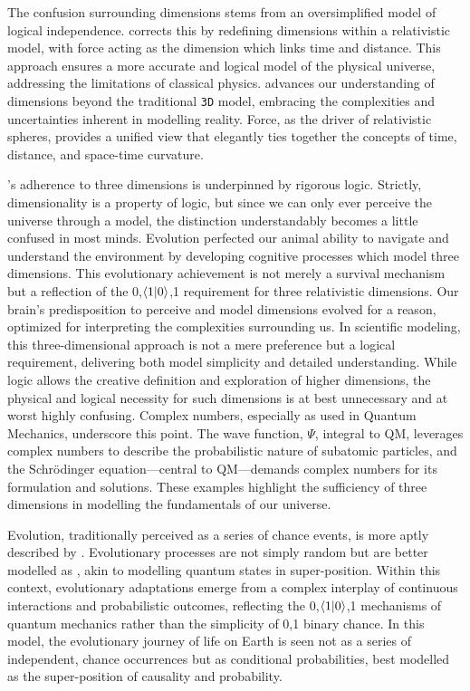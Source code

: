 \documentclass[12pt]{article}
\begin{document}
The confusion surrounding dimensions stems from an oversimplified model of logical independence. \iR{} corrects this by redefining dimensions within a relativistic model, with force acting as the dimension which links time and distance. This approach ensures a more accurate and logical model of the physical universe, addressing the limitations of classical physics. \iR{} advances our understanding of dimensions beyond the traditional \texttt{3D} model, embracing the complexities and uncertainties inherent in modelling reality. Force, as the driver of relativistic spheres, provides a unified view that elegantly ties together the concepts of time, distance, and space-time curvature.

\iR{}'s adherence to three dimensions is underpinned by rigorous logic. Strictly, dimensionality is a property of logic, but since we can only ever perceive the universe through a model, the distinction understandably becomes a little confused in most minds. Evolution perfected our animal ability to navigate and understand the environment by developing cognitive processes which model three dimensions. This evolutionary achievement is not merely a survival mechanism but a reflection of the {0,\(\langle 1 | 0 \rangle\),1} requirement for three relativistic dimensions. Our brain's predisposition to perceive and model dimensions evolved for a reason, optimized for interpreting the complexities surrounding us. In scientific modeling, this three-dimensional approach is not a mere preference but a logical requirement, delivering both model simplicity and detailed understanding. While logic allows the creative definition and exploration of higher dimensions, the physical and logical necessity for such dimensions is at best unnecessary and at worst highly confusing. Complex numbers, especially as used in Quantum Mechanics, underscore this point. The wave function, \(\Psi\), integral to QM, leverages complex numbers to describe the probabilistic nature of subatomic particles, and the Schrödinger equation—central to QM—demands complex numbers for its formulation and solutions. These examples highlight the sufficiency of three dimensions in modelling the fundamentals of our universe.

Evolution, traditionally perceived as a series of chance events, is more aptly described by \iR{}. Evolutionary processes are not simply random but are better modelled as \iR{}, akin to modelling quantum states in super-position. Within this context, evolutionary adaptations emerge from a complex interplay of continuous interactions and probabilistic outcomes, reflecting the {0,\(\langle 1 | 0 \rangle\),1} mechanisms of quantum mechanics rather than the simplicity of {0,1} binary chance. In this model, the evolutionary journey of life on Earth is seen not as a series of independent, chance occurrences but as conditional probabilities, best modelled as the super-position of causality and probability.
\end{document}
